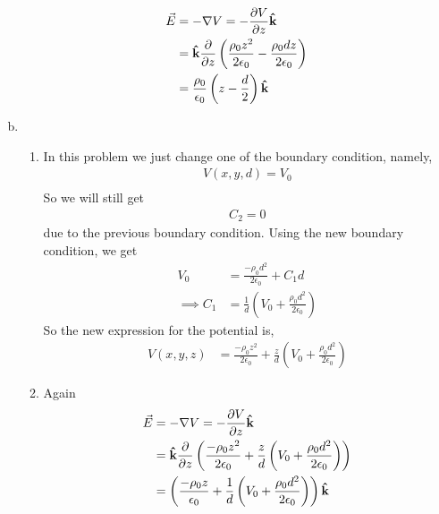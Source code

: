 \begin{problem}{}{}
\begin{enumerate}[(a)]
\begin{align*}
            \vec{E} &= -\mathbb{\nabla}V = -\frac{\partial V}{\partial z}\boldsymbol{\hat{\textbf{k}}}\\
                &= \boldsymbol{\hat{\textbf{k}}}\frac{\partial}{\partial z}\left(\frac{\rho_0 z^2}{2\epsilon_0} - \frac{\rho_0 dz}{2\epsilon_0}\right)\\
                &= \frac{\rho_0}{\epsilon_0}\left(z - \frac{d}{2}\right)\boldsymbol{\hat{\textbf{k}}}
        \end{align*}
        \item 
            \begin{enumerate}
                \item In this problem we just change one of the boundary condition, namely,   
                    \begin{align*}
                        V(x, y, d) = V_0\\
                    \end{align*}
                    So we will still get \begin{align*}
                        C_2 = 0
                    \end{align*} due to the previous boundary condition. Using the new boundary condition, we get
                    \begin{align*}
                        V_0  &= \frac{-\rho_0 d^2}{2\epsilon_0} + C_1d\\
                        \implies C_1 &= \frac{1}{d}\left(V_0 + \frac{\rho_0 d^2}{2\epsilon_0}\right)
                    \end{align*}
                    So the new expression for the potential is,
                    \begin{align*}
                        V(x, y, z) &= \frac{-\rho_0 z^2}{2\epsilon_0} + \frac{z}{d}\left(V_0 + \frac{\rho_0 d^2}{2\epsilon_0}\right)
                    \end{align*}
                \item  
                    Again
                        \begin{align*}
                            \vec{E} &= -\mathbb{\nabla}V = -\frac{\partial V}{\partial z}\boldsymbol{\hat{\textbf{k}}}\\
                                &= \boldsymbol{\hat{\textbf{k}}}\frac{\partial}{\partial z}\left(\frac{-\rho_0 z^2}{2\epsilon_0} + \frac{z}{d}\left(V_0 + \frac{\rho_0 d^2}{2\epsilon_0}\right)\right)\\
                                &= \left(\frac{-\rho_0 z}{\epsilon_0} + \frac{1}{d}\left(V_0 + \frac{\rho_0 d^2}{2\epsilon_0}\right)\right)\boldsymbol{\hat{\textbf{k}}}
                        \end{align*}
            \end{enumerate}
    \end{enumerate}
 \end{problem}



